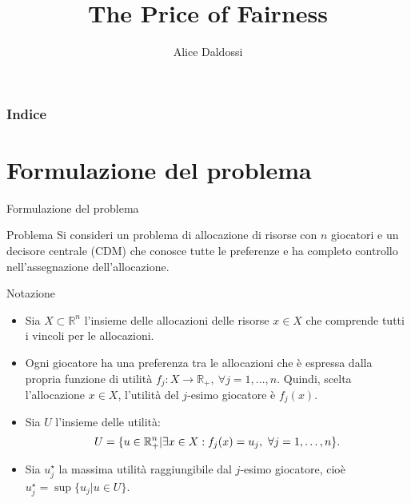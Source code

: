 \documentclass{beamer}
\title{The Price of Fairness}
\author{Alice Daldossi}
\institute{Università degli Studi di Pavia}
\date
\begin{document}
	
	\frame{\titlepage}
	
\begin{frame}
	\frametitle{Indice}
	\tableofcontents
\end{frame}

\section{Formulazione del problema}

\begin{frame}{Formulazione del problema}
	\begin{exampleblock}{Problema}
		Si consideri un problema di allocazione di risorse con $n$ giocatori e un decisore centrale (CDM) che conosce tutte le preferenze e ha completo controllo nell'assegnazione dell'allocazione. 
	\end{exampleblock}
\end{frame}

\begin{frame}
	\begin{block}{Notazione}
		\begin{itemize}
			\item Sia $X \subset \mathbb{R}^n$ l'insieme delle allocazioni delle risorse $x \in X$  che comprende tutti i vincoli per le allocazioni.\\
			\item Ogni giocatore ha una preferenza tra le allocazioni che è espressa dalla propria funzione di utilità $f_j: X \rightarrow \mathbb{R}_+, \ \forall j=1,\dots,n.$
			Quindi, scelta l'allocazione $x \in X$, l'utilità del $j$-esimo giocatore è $f_j(x)$.\\
			\item Sia $U$ l'insieme delle utilità: 
			\vspace{-0.3cm}
			\begin{equation*}
				U = \{ u \in \mathbb{R}^n_+ | \exists x \in X: f_j(x) = u_j, \ \forall j=1,\dots,n \}.
				\vspace{-0.3cm}
			\end{equation*}
			\item Sia $u_j^\star$ la massima utilità raggiungibile dal $j$-esimo giocatore, cioè $u_j^\star = \sup\{ u_j | u \in U \}$.
		\end{itemize}
	\end{block}
\end{frame}
\end{document}
